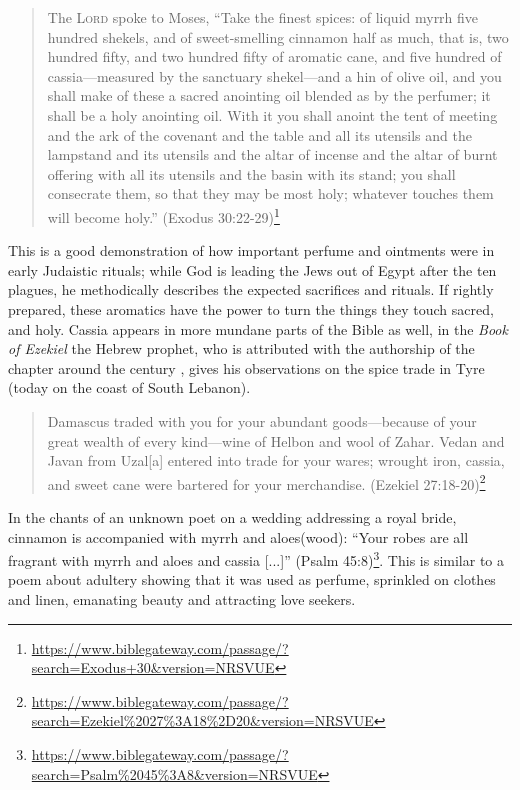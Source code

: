 \begin{quote}
     The \textsc{Lord} spoke to Moses,  ``Take the finest spices: of liquid myrrh five hundred shekels, and of sweet-smelling cinnamon half as much, that is, two hundred fifty, and two hundred fifty of aromatic cane,  and five hundred of cassia—measured by the sanctuary shekel—and a hin of olive oil,  and you shall make of these a sacred anointing oil blended as by the perfumer; it shall be a holy anointing oil.  With it you shall anoint the tent of meeting and the ark of the covenant  and the table and all its utensils and the lampstand and its utensils and the altar of incense  and the altar of burnt offering with all its utensils and the basin with its stand;  you shall consecrate them, so that they may be most holy; whatever touches them will become holy.'' (Exodus 30:22-29)\footnote{\url{https://www.biblegateway.com/passage/?search=Exodus+30&version=NRSVUE}} 
\end{quote}

This is a good demonstration of how important perfume and ointments were in early Judaistic rituals; while God is leading the Jews out of Egypt after the ten plagues, he methodically describes the expected sacrifices and rituals. If rightly prepared, these aromatics have the power to turn the things they touch sacred, and holy. Cassia appears in more mundane parts of the Bible as well, in the \textit{Book of Ezekiel} the Hebrew prophet, who is attributed with the authorship of the chapter around the  century \BC{}, gives his observations on the spice trade in Tyre (today on the coast of South Lebanon).

\begin{quote}
   Damascus traded with you for your abundant goods—because of your great wealth of every kind—wine of Helbon and wool of Zahar.  Vedan and Javan from Uzal[a] entered into trade for your wares; wrought iron, cassia, and sweet cane were bartered for your merchandise. (Ezekiel 27:18-20)\footnote{\url{https://www.biblegateway.com/passage/?search=Ezekiel\%2027\%3A18\%2D20&version=NRSVUE}}
\end{quote}

In the chants of an unknown poet on a wedding addressing a royal bride, cinnamon is accompanied with myrrh and aloes(wood): ``Your robes are all fragrant with myrrh and aloes and cassia [...]'' (Psalm 45:8)\footnote{\url{https://www.biblegateway.com/passage/?search=Psalm\%2045\%3A8&version=NRSVUE}}. This is similar to a poem about adultery showing that it was used as perfume, sprinkled on clothes and linen, emanating beauty and attracting love seekers.

